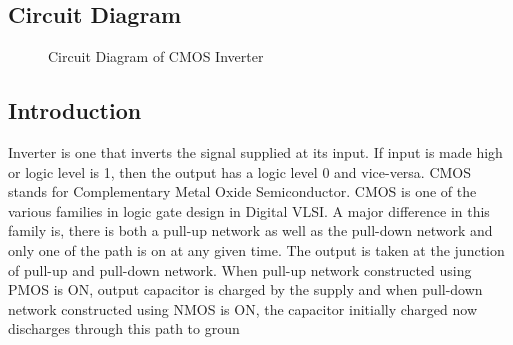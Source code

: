 \documentclass[12pt]{article}
\begin{document}
	\subsection{Circuit Diagram}
	\begin{figure}[H]
		\begin{center}
			
			\caption{Circuit Diagram of CMOS Inverter}
			\label{fig::cmosinvckt}
		\end{center}
	\end{figure}
	
	\subsection{Introduction}
	Inverter is one that inverts the signal supplied at its input. If input is made high or logic level is 1, then the output has a logic level 0 and vice-versa. CMOS stands for Complementary Metal Oxide Semiconductor. CMOS is one of the various families in logic gate design in Digital VLSI. A major difference in this family is, there is both a pull-up network as well as the pull-down network and only one of the path is on at any given time. The output is taken at the junction of pull-up and pull-down network. When pull-up network constructed using PMOS is ON, output capacitor is charged by the supply and when pull-down network constructed using NMOS is ON, the capacitor initially charged now discharges through this path to groun
	
\end{document}
